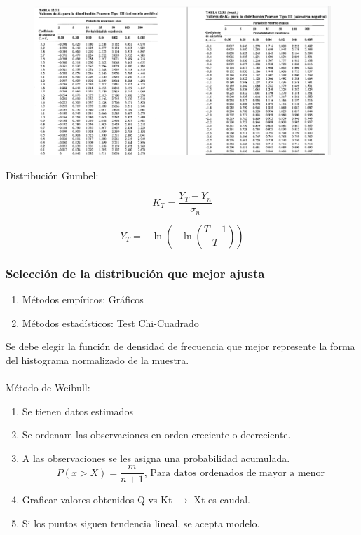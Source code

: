 \begin{figure}[H]
    \centering
    \includegraphics[width=1.1\textwidth]{imagenes/lista_kt.png}
    \label{fig:kt_3}
\end{figure}

Distribución Gumbel:

\begin{equation}
    K_T = \frac{Y_T-Y_n}{\sigma_n}
\end{equation}

\begin{equation}
    Y_T = -\ln\left(-\ln\left(\frac{T-1}{T}\right)\right)
\end{equation}

\subsubsection{Selección de la distribución que mejor ajusta}

\begin{enumerate}
    \item Métodos empíricos: Gráficos
    \item Métodos estadísticos: Test Chi-Cuadrado
\end{enumerate}

Se debe elegir la función de densidad de frecuencia que mejor represente la forma del histograma normalizado de la muestra.
\\\\
Método de Weibull:

\begin{enumerate}
    \item Se tienen datos estimados
    \item Se ordenam las observaciones en orden creciente o decreciente.
    \item A las observaciones se les asigna una probabilidad acumulada.
    \begin{equation}
        P(x>X) = \frac{m}{n+1} \text{, Para datos ordenados de mayor a menor}
    \end{equation}
    \item Graficar valores obtenidos Q vs Kt $\rightarrow$ Xt es caudal.
    \item Si los puntos siguen tendencia lineal, se acepta modelo.
\end{enumerate}

